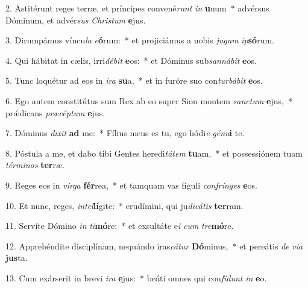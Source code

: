 2. Astitérunt reges terræ, et príncipes convené\textit{runt} \textit{in} \textbf{u}num~*  advérsus Dóminum, et advér\textit{sus} \textit{Chris}\textit{tum} \textbf{e}jus.\

3. Dirumpámus víncu\textit{la} \textit{e}\textbf{ó}rum:~*  et projiciámus a nobis \textit{ju}\textit{gum} \textit{ip}\textbf{só}rum.\

4. Qui hábitat in cælis, irri\textit{dé}\textit{bit} \textbf{e}os:~*  et Dóminus sub\textit{san}\textit{ná}\textit{bit} \textbf{e}os.\

5. Tunc loquétur ad eos in \textit{i}\textit{ra} \textbf{su}a,~*  et in furóre suo con\textit{tur}\textit{bá}\textit{bit} \textbf{e}os.\

6. Ego autem constitútus sum Rex ab eo super Sion montem \textit{sanc}\textit{tum} \textbf{e}jus,~*  prǽdicans \textit{præ}\textit{cép}\textit{tum} \textbf{e}jus.\

7. Dóminus \textit{di}\textit{xit} \textbf{ad} me:~*  Fílius meus es tu, ego hódi\textit{e} \textit{gé}\textit{nu}\textbf{i} te.\

8. Póstula a me, et dabo tibi Gentes heredi\textit{tá}\textit{tem} \textbf{tu}am,~*  et possessiónem tuam \textit{tér}\textit{mi}\textit{nos} \textbf{ter}ræ.\

9. Reges eos in \textit{vir}\textit{ga} \textbf{fér}rea,~*  et tamquam vas fíguli \textit{con}\textit{frín}\textit{ges} \textbf{e}os.\

10. Et nunc, reges, \textit{in}\textit{tel}\textbf{lí}gite:~*  erudímini, qui ju\textit{di}\textit{cá}\textit{tis} \textbf{ter}ram.\

11. Servíte Dómino \textit{in} \textit{ti}\textbf{mó}re:~*  et exsultáte e\textit{i} \textit{cum} \textit{tre}\textbf{mó}re.\

12. Apprehéndite disciplínam, nequándo iras\textit{cá}\textit{tur} \textbf{Dó}minus,~*  et pereátis \textit{de} \textit{vi}\textit{a} \textbf{jus}ta.\

13. Cum exárserit in brevi \textit{i}\textit{ra} \textbf{e}jus:~*  beáti omnes qui con\textit{fí}\textit{dunt} \textit{in} \textbf{e}o.\

